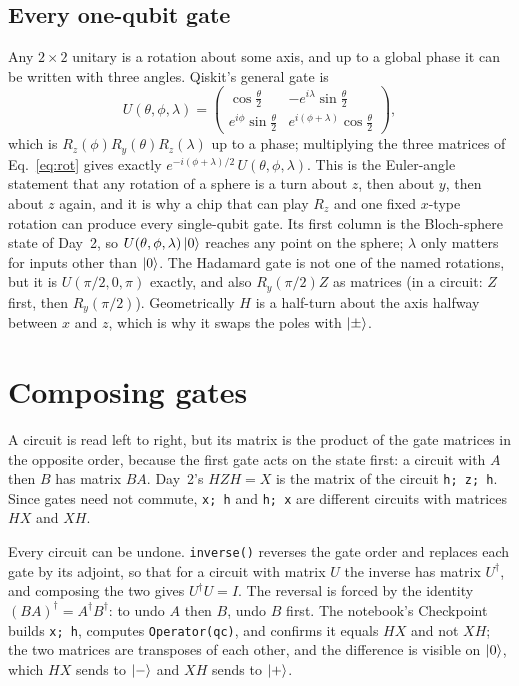 \documentclass[11pt]{article}
\newcommand{\code}[1]{\texttt{#1}}
\begin{document}
\subsection{Every one-qubit gate}

Any $2\times2$ unitary is a rotation about some axis, and up to a global phase it can be written with three angles. Qiskit's general gate is
\begin{equation}
U(\theta,\phi,\lambda) = \begin{pmatrix}\cos\frac\theta2 & -e^{i\lambda}\sin\frac\theta2\\ e^{i\phi}\sin\frac\theta2 & e^{i(\phi+\lambda)}\cos\frac\theta2\end{pmatrix},
\label{eq:u}
\end{equation}
which is $R_z(\phi)R_y(\theta)R_z(\lambda)$ up to a phase; multiplying the three matrices of Eq.~\eqref{eq:rot} gives exactly $e^{-i(\phi+\lambda)/2}\,U(\theta,\phi,\lambda)$. This is the Euler-angle statement that any rotation of a sphere is a turn about $z$, then about $y$, then about $z$ again, and it is why a chip that can play $R_z$ and one fixed $x$-type rotation can produce every single-qubit gate. Its first column is the Bloch-sphere state of Day~2, so $U(\theta,\phi,\lambda)\ket{0}$ reaches any point on the sphere; $\lambda$ only matters for inputs other than $\ket{0}$. The Hadamard gate is not one of the named rotations, but it is $U(\pi/2, 0, \pi)$ exactly, and also $R_y(\pi/2)Z$ as matrices (in a circuit: $Z$ first, then $R_y(\pi/2)$). Geometrically $H$ is a half-turn about the axis halfway between $x$ and $z$, which is why it swaps the poles with $\ket{\pm}$.

\section{Composing gates}

A circuit is read left to right, but its matrix is the product of the gate matrices in the opposite order, because the first gate acts on the state first: a circuit with $A$ then $B$ has matrix $BA$. Day~2's $HZH = X$ is the matrix of the circuit \code{h; z; h}. Since gates need not commute, \code{x; h} and \code{h; x} are different circuits with matrices $HX$ and $XH$.

Every circuit can be undone. \code{inverse()} reverses the gate order and replaces each gate by its adjoint, so that for a circuit with matrix $U$ the inverse has matrix $U^\dagger$, and composing the two gives $U^\dagger U = I$. The reversal is forced by the identity $(BA)^\dagger = A^\dagger B^\dagger$: to undo $A$ then $B$, undo $B$ first. The notebook's Checkpoint builds \code{x; h}, computes \code{Operator(qc)}, and confirms it equals $HX$ and not $XH$; the two matrices are transposes of each other, and the difference is visible on $\ket{0}$, which $HX$ sends to $\ket{-}$ and $XH$ sends to $\ket{+}$.
\end{document}
